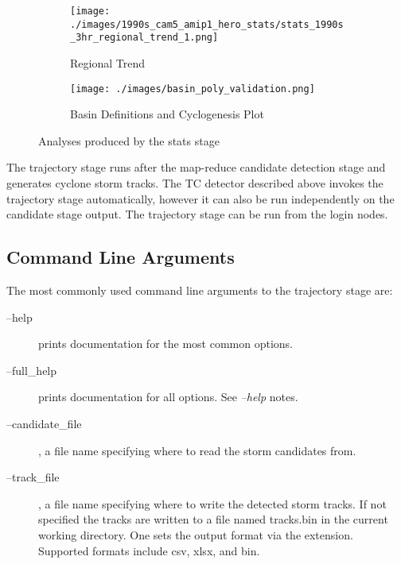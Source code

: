 \documentclass[a4paper,10pt,DIV=12]{scrreprt}
\begin{document}
\begin{figure}
    \begin{subfigure}[b]{0.3\textwidth}
      \centering
      \texttt{[image: ./images/1990s\_cam5\_amip1\_hero\_stats/stats\_1990s\_3hr\_regional\_trend\_1.png]}
      \caption{Regional Trend}
      \label{fig:trend}
    \end{subfigure}
    \hspace{0.08in}
    \begin{subfigure}[b]{0.6\textwidth}
    \centering
         \texttt{[image: ./images/basin\_poly\_validation.png]}
        \caption{Basin Definitions and Cyclogenesis Plot}
        \label{fig:dist}
    \end{subfigure}
    \hspace{0.08in}
    \caption{Analyses produced by the stats stage}\label{fig:stats_stage}
\end{figure}

The trajectory stage runs after the map-reduce candidate detection stage and generates cyclone storm tracks. The TC detector described above invokes the trajectory stage automatically, however it can also be run independently on the candidate stage output. The trajectory stage can be run from the login nodes.

\subsection{Command Line Arguments}
\noindent The most commonly used command line arguments to the trajectory stage are:
\begin{description}
\item[--help] prints documentation for the most common options.
\item[--full\_help] prints documentation for all options. See \textit{--help} notes.
\item[--candidate\_file], a file name specifying where to read the storm candidates from. 
\item[--track\_file], a file name specifying where to write the detected storm tracks. If not specified the tracks are written to a file named tracks.bin in the current working directory. One sets the output format via the extension. Supported formats include csv, xlsx, and bin.
\end{description}
\end{document}
